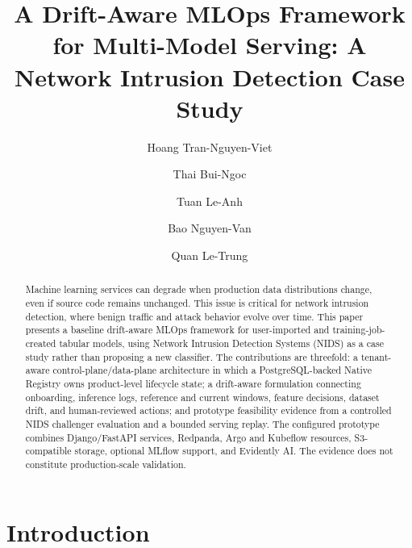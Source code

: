 \documentclass[runningheads]{llncs}
\begin{document}
\title{A Drift-Aware MLOps Framework for Multi-Model Serving: A Network Intrusion Detection Case Study}


\author{Hoang Tran-Nguyen-Viet \and
Thai Bui-Ngoc \and
Tuan Le-Anh \and
Bao Nguyen-Van \and
Quan Le-Trung
}



\maketitle

\begin{abstract}
Machine learning services can degrade when production data distributions change, even if source code remains unchanged. This issue is critical for network intrusion detection, where benign traffic and attack behavior evolve over time. This paper presents a baseline drift-aware MLOps framework for user-imported and training-job-created tabular models, using Network Intrusion Detection Systems (NIDS) as a case study rather than proposing a new classifier. The contributions are threefold: a tenant-aware control-plane/data-plane architecture in which a PostgreSQL-backed Native Registry owns product-level lifecycle state; a drift-aware formulation connecting onboarding, inference logs, reference and current windows, feature decisions, dataset drift, and human-reviewed actions; and prototype feasibility evidence from a controlled NIDS challenger evaluation and a bounded serving replay. The configured prototype combines Django/FastAPI services, Redpanda, Argo and Kubeflow resources, S3-compatible storage, optional MLflow support, and Evidently AI. The evidence does not constitute production-scale validation.

\end{abstract}

\section{Introduction}
\end{document}
